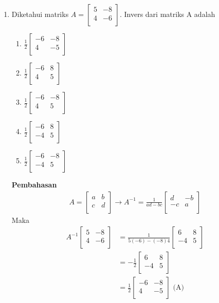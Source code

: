 \documentclass{report}
\newcommand{\options}[5]{
\begin{enumerate}[label=\alph*.]
	\item #1
	\item #2
	\item #3
	\item #4
	\item #5
\end{enumerate}
}
\newcommand{\pemb}{ \textbf{Pembahasan} \\}
\begin{document}
\begin{enumerate}
\item Diketahui matriks $A = \begin{bmatrix}
	5 & -8 \\
	4 & -6 \\
\end{bmatrix}$. Invers dari matriks A adalah
\options
{$
	\frac{1}{2} 
	\begin{bmatrix}
		-6 & -8 \\
		4 & -5 \\
	\end{bmatrix}
$}
{$
	\frac{1}{2} 
	\begin{bmatrix}
		-6 & 8 \\
		4 & 5 \\
	\end{bmatrix}
$}
{$
	\frac{1}{2} 
	\begin{bmatrix}
		-6 & -8 \\
		4 & 5 \\
	\end{bmatrix}
$}
{$
	\frac{1}{2} 
	\begin{bmatrix}
		-6 & 8 \\
		-4 & 5 \\
	\end{bmatrix}
$}
{$
	\frac{1}{2} 
	\begin{bmatrix}
		-6 & -8 \\
		-4 & 5 \\
	\end{bmatrix}
$}
\pemb
\begin{align*}
    A = \begin{bmatrix}
		a & b \\
		c & d \\
	\end{bmatrix}
	\to
	A^{-1} = 
	\frac{1}{ad-bc}
	\begin{bmatrix}
		d & -b \\
		-c & a \\
	\end{bmatrix}
\end{align*}
Maka 
\begin{align*}
	A^{-1}
	\begin{bmatrix}
		5 & -8 \\
		4 & -6 \\
	\end{bmatrix}
	&= \frac{1}{5(-6) - (-8)4} 
	\begin{bmatrix}
		6 & 8 \\
		-4 & 5 \\
	\end{bmatrix} \\
	&= -\frac{1}{2} 
	\begin{bmatrix}
		6 & 8 \\
		-4 & 5 \\
	\end{bmatrix}\\
	&= \frac{1}{2} 
	\begin{bmatrix}
		-6 & -8 \\
		4 & -5 \\
	\end{bmatrix} \text{ (A)}
\end{align*}


\end{enumerate}
\end{document}
